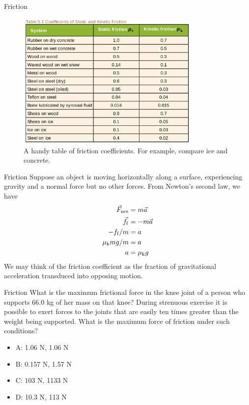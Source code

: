 \documentclass{beamer}
\begin{document}
\begin{frame}{Friction}
\begin{figure}
\centering
\includegraphics[width=0.8\textwidth]{figures/friction2.png}
\caption{\label{fig:fric2} A handy table of friction coefficients.  For example, compare ice and concrete.}
\end{figure}
\end{frame}

\begin{frame}{Friction}
Suppose an object is moving horizontally along a surface, experiencing gravity and a normal force but no other forces.  From Newton's second law, we have \\
\begin{align}
\vec{F}_{\rm net} &= m \vec{a} \\
\vec{f}_{\rm f} &= -m\vec{a} \\
-f_{\rm f}/m &= a \\
\mu_{\rm k} m g / m &= a \\
a &= \mu_{\rm k} g
\end{align}
We may think of the friction coefficient as the fraction of gravitational acceleration transduced into opposing motion.
\end{frame}

\begin{frame}{Friction}
What is the maximum frictional force in the knee joint of a person who supports 66.0 kg of her mass on that knee?  During strenuous exercise it is possible to exert forces to the joints that are easily ten times greater than the weight being supported. What is the maximum force of friction under such conditions?
\begin{itemize}
\item A: 1.06 N, 1.06 N
\item B: 0.157 N, 1.57 N
\item C: 103 N, 1133 N
\item D: 10.3 N, 113 N
\end{itemize}
\end{frame}
\end{document}
